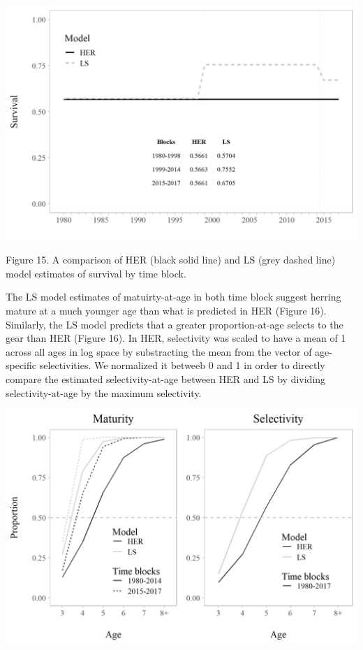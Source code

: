 \documentclass[]{article}
\begin{document}
\includegraphics[width=1\linewidth]{../../HER/figs/compare_survival}

Figure 15. A comparison of HER (black solid line) and LS (grey dashed
line) model estimates of survival by time block.

The LS model estimates of matuirty-at-age in both time block suggest
herring mature at a much younger age than what is predicted in HER
(Figure 16). Similarly, the LS model predicts that a greater
proportion-at-age selects to the gear than HER (Figure 16). In HER,
selectivity was scaled to have a mean of 1 across all ages in log space
by substracting the mean from the vector of age-specific selectivities.
We normalized it betweeb 0 and 1 in order to directly compare the
estimated selectivity-at-age between HER and LS by dividing
selectivity-at-age by the maximum selectivity.

\includegraphics[width=1\linewidth]{../../HER/figs/compare_mat_sel}
\end{document}
